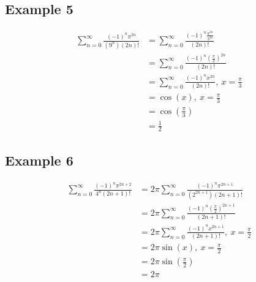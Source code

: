 \documentclass{article}
\theoremstyle{mytheoremstyle}
\theoremstyle{mytheoremstyle}
\theoremstyle{myproblemstyle}
\begin{document}
    \subsection*{Example 5}
    \begin{align*}
        \sum_{n=0}^{\infty} \frac{(-1)^n\pi^{2n}}{(9^n)(2n)!}
        &= \sum_{n=0}^{\infty} \frac{(-1)^n\frac{\pi^{2n}}{3^{2n}}}{(2n)!} \\
        &= \sum_{n=0}^{\infty} \frac{(-1)^n(\frac{\pi}{3})^{2n}}{(2n)!} \\
        &= \sum_{n=0}^{\infty} \frac{(-1)^nx^{2n}}{(2n)!},\ x=\frac{\pi}{3} \\
        &= \cos(x),\ x=\frac{\pi}{3} \\
        &= \cos(\frac{\pi}{3}) \\
        &= \frac{1}{2}
    \end{align*}
    \subsection*{Example 6}
    \begin{align*}
        \sum_{n=0}^{\infty} \frac{(-1)^n\pi^{2n+2}}{4^n(2n+1)!}
        &= 2\pi \sum_{n=0}^{\infty} \frac{(-1)^n\pi^{2n+1}}{(2^{2n+1})(2n+1)!} \\
        &= 2\pi \sum_{n=0}^{\infty} \frac{(-1)^n(\frac{\pi}{2})^{2n+1}}{(2n+1)!} \\
        &= 2\pi \sum_{n=0}^{\infty} \frac{(-1)^nx^{2n+1}}{(2n+1)!},\ x= \frac{\pi}{2} \\
        &= 2\pi \sin(x),\ x= \frac{\pi}{2} \\
        &= 2\pi \sin(\frac{\pi}{2}) \\
        &= 2\pi
    \end{align*}
\end{document}
